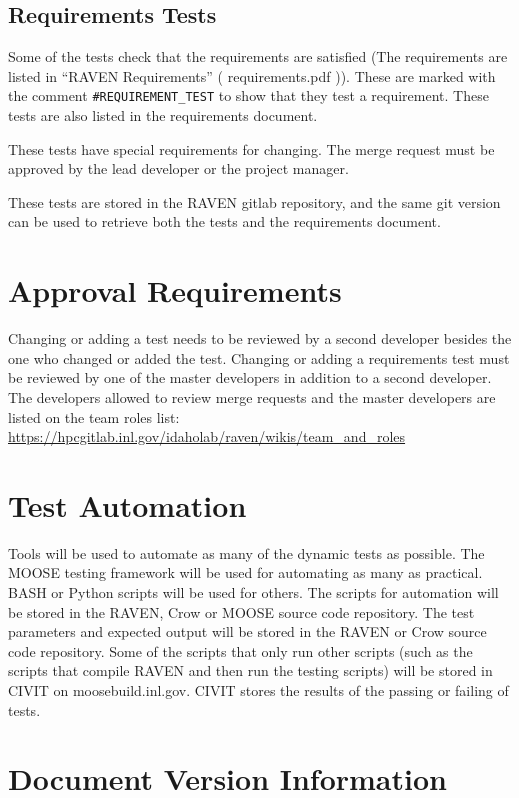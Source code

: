\documentclass{article}
\begin{document}
\subsection{Requirements Tests}

Some of the tests check that the requirements are satisfied (The
requirements are listed in ``RAVEN Requirements'' ( requirements.pdf
)).  These are marked with the comment \verb'#REQUIREMENT_TEST' to show
that they test a requirement.  These tests are also listed in the
requirements document.

These tests have special requirements for changing.  The merge request
must be approved by the lead developer or the project manager.

These tests are stored in the RAVEN gitlab repository, and the same
git version can be used to retrieve both the tests and the
requirements document.

\section{Approval Requirements}

Changing or adding a test needs to be reviewed by a second developer
besides the one who changed or added the test.  Changing or adding a
requirements test must be reviewed by one of the master developers in
addition to a second developer.  The developers allowed to review
merge requests and the master developers are listed on the team roles
list:
\url{https://hpcgitlab.inl.gov/idaholab/raven/wikis/team_and_roles}



\section{Test Automation}

Tools will be used to automate as many of the dynamic tests as
possible.  The MOOSE testing framework will be used for automating as
many as practical.  BASH or Python scripts will be used for others.
The scripts for automation will be stored in the RAVEN, Crow or MOOSE
source code repository.  The test parameters and expected output will
be stored in the RAVEN or Crow source code repository. Some of the
scripts that only run other scripts (such as the scripts that compile
RAVEN and then run the testing scripts) will be stored in CIVIT on
moosebuild.inl.gov.  CIVIT stores the results of the passing or
failing of tests.

\section*{Document Version Information}


\end{document}
